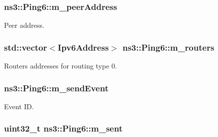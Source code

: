 \subsubsection[{\texorpdfstring{m\+\_\+peer\+Address}{m_peerAddress}}]{ ns3\+::\+Ping6\+::m\+\_\+peer\+Address\hspace{0.3cm}{\ttfamily [private]}}\hypertarget{classns3_1_1Ping6_ad0b9bf2e656c09ab204d51d0a04e4b25}{}\label{classns3_1_1Ping6_ad0b9bf2e656c09ab204d51d0a04e4b25}


Peer address. 

\subsubsection[{\texorpdfstring{m\+\_\+routers}{m_routers}}]{\setlength{\rightskip}{0pt plus 5cm}std\+::vector$<${\bf Ipv6\+Address}$>$ ns3\+::\+Ping6\+::m\+\_\+routers\hspace{0.3cm}{\ttfamily [private]}}\hypertarget{classns3_1_1Ping6_a6f3aa884473637142689ee9bae07394f}{}\label{classns3_1_1Ping6_a6f3aa884473637142689ee9bae07394f}


Routers addresses for routing type 0. 

\subsubsection[{\texorpdfstring{m\+\_\+send\+Event}{m_sendEvent}}]{ ns3\+::\+Ping6\+::m\+\_\+send\+Event\hspace{0.3cm}{\ttfamily [private]}}\hypertarget{classns3_1_1Ping6_a4a3a1991d21fbcc690af300d303ee552}{}\label{classns3_1_1Ping6_a4a3a1991d21fbcc690af300d303ee552}


Event ID. 

\subsubsection[{\texorpdfstring{m\+\_\+sent}{m_sent}}]{\setlength{\rightskip}{0pt plus 5cm}uint32\+\_\+t ns3\+::\+Ping6\+::m\+\_\+sent\hspace{0.3cm}{\ttfamily [private]}}\hypertarget{classns3_1_1Ping6_abbf4b7aed35f816690838a13e533ea9f}{}\label{classns3_1_1Ping6_abbf4b7aed35f816690838a13e533ea9f}


